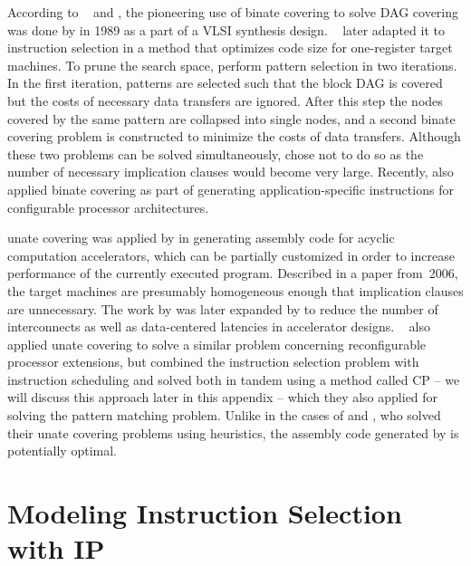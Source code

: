 According to \citeauthor{Liao1995}~\cite{Liao1995, Liao1998} and
\textcite{Cong2004}, the pioneering use of \gls{binate covering} to solve
\gls{DAG covering} was done by \textcite{Rudell1989} in 1989 as a part of a
\gls{VLSI} synthesis design.
%
\citeauthor{Liao1995}~\cite{Liao1995, Liao1998} later adapted it to
\gls{instruction selection} in a method that optimizes code size for
one-\gls{register} \glspl{target machine}.
%
To prune the search space, \citeauthor{Liao1995} perform \gls{pattern selection}
in two iterations.
%
In the first iteration, \glspl{pattern} are selected such that the \gls{block
  DAG} is covered but the costs of necessary data transfers are ignored.
%
After this step the \glspl{node} covered by the same \gls{pattern} are collapsed
into single \glspl{node}, and a second \gls{binate covering} problem is
constructed to minimize the costs of data transfers.
%
Although these two problems can be solved simultaneously, \citeauthor{Liao1995}
chose not to do so as the number of necessary \glspl{implication clause} would
become very large.
%
Recently, \textcite{Cong2004} also applied \gls{binate covering} as part of
generating application-specific \glspl{instruction} for configurable processor
architectures.

\Gls{unate covering} was applied by \textcite{Clark2006} in generating
\gls{assembly code} for acyclic computation accelerators, which can be partially
customized in order to increase performance of the currently executed
\gls{program}.
%
Described in a paper from~2006, the \glspl{target machine} are presumably
homogeneous enough that \glspl{implication clause} are unnecessary.
%
The work by \citeauthor{Clark2006} was later expanded by \textcite{Hormati2007}
to reduce the number of interconnects as well as data-centered latencies in
accelerator designs.
%
\citeauthor{Martin2009}~\cite{Martin2009, Martin2012} also applied \gls{unate
  covering} to solve a similar problem concerning reconfigurable processor
extensions, but combined the \gls{instruction selection} problem with
\gls{instruction scheduling} and solved both in tandem using a method called
\glsdesc{CP} -- we will discuss this approach later in this appendix -- which
they also applied for solving the \gls{pattern matching} problem.
%
Unlike in the cases of \citeauthor{Clark2006} and \citeauthor{Hormati2007}, who
solved their \gls{unate covering} problems using heuristics, the \gls{assembly
  code} generated by \citeauthor{Martin2009} is potentially optimal.


\section{Modeling Instruction Selection with IP}

